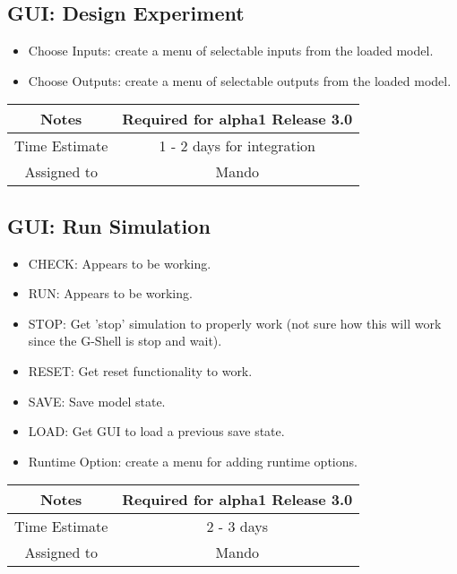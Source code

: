 \documentclass[12pt]{article}
\begin{document}
\subsection{GUI: Design Experiment}
\begin{itemize}
\item Choose Inputs: create a menu of selectable inputs from the loaded model.
\item Choose Outputs: create a menu of selectable outputs from the loaded model.
\end{itemize}

{
  \vspace{5mm}
  \centering
  \begin{tabular}{|c|c|}
    \hline
    Notes
    & Required for alpha1 Release 3.0 \\
    \hline
    Time Estimate
    & 1 - 2 days for integration \\
    \hline
    Assigned to
    & Mando \\
    \hline
  \end{tabular}
}


\subsection{GUI: Run Simulation}
\begin{itemize}
\item CHECK: Appears to be working.
\item RUN: Appears to be working.      
\item STOP: Get 'stop' simulation to properly work (not sure how this
  will work since the G-Shell is stop and wait).
\item RESET: Get reset functionality to work.
\item SAVE: Save model state.
\item LOAD: Get GUI to load a previous save state.
\item Runtime Option: create a menu for adding runtime options.
\end{itemize}

{
  \vspace{5mm}
  \centering
  \begin{tabular}{|c|c|}
    \hline
    Notes
    & Required for alpha1 Release 3.0 \\
    \hline
    Time Estimate
    & 2 - 3 days \\
    \hline
    Assigned to
    & Mando \\
    \hline
  \end{tabular}
}
\end{document}

